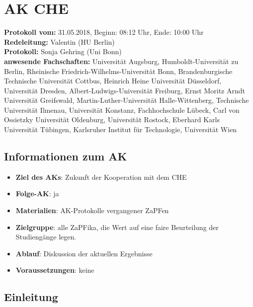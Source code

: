 
\section{AK CHE}

	\textbf{Protokoll vom:} 31.05.2018,
	Beginn: 08:12 Uhr,
	Ende: 10:00 Uhr \\
	\textbf{Redeleitung:} Valentin (HU Berlin) \\
	\textbf{Protokoll:} Sonja Gehring (Uni Bonn) \\
	\textbf{anwesende Fachschaften:} Universität Augsburg, Humboldt-Universität zu Berlin, Rheinische Friedrich-Wilhelms-Universität Bonn, Brandenburgische Technische Universität Cottbus, Heinrich Heine Universität Düsseldorf, Universität Dresden, Albert-Ludwigs-Universität Freiburg, Ernst Moritz Arndt Universität Greifswald, Martin-Luther-Universität Halle-Wittenberg, Technische Universität Ilmenau, Universität Konstanz, Fachhochschule Lübeck, Carl von Ossietzky Universität Oldenburg, Universität Rostock, Eberhard Karls Universität Tübingen, Karlsruher Institut für Technologie, Universität Wien

	\subsection*{Informationen zum AK}
		\begin{itemize}
			\item \textbf{Ziel des AKs}: Zukunft der Kooperation mit dem CHE
			\item \textbf{Folge-AK}: ja
      \item \textbf{Materialien}: AK-Protokolle vergangener ZaPFen
			\item \textbf{Zielgruppe}: alle ZaPFika, die Wert auf eine faire Beurteilung der Studiengänge legen.
			\item \textbf{Ablauf}: Diskussion der aktuellen Ergebnisse
			\item \textbf{Voraussetzungen}: keine
		\end{itemize}

  \subsection*{Einleitung}
